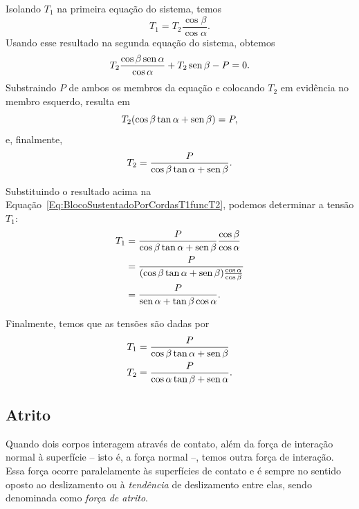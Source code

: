 \noindent{}Isolando $T_1$ na primeira equação do sistema, temos
\begin{equation}\label{Eq:BlocoSustentadoPorCordasT1funcT2}
    T_1 = T_2 \frac{\cos\beta}{\cos\alpha}.
\end{equation}
%
Usando esse resultado na segunda equação do sistema, obtemos
\begin{equation}
    T_2 \frac{\cos\beta\operatorname{sen}\alpha}{\cos\alpha} + T_2\operatorname{sen}\beta - P = 0.
\end{equation}
%
Substraindo $P$ de ambos os membros da equação e colocando $T_2$ em evidência no membro esquerdo, resulta em
\begin{equation}
    T_2 (\cos\beta\tan\alpha + \operatorname{sen}\beta) = P,
\end{equation}
%
e, finalmente,
\begin{equation}
    T_2 = \frac{P}{\cos\beta\tan\alpha + \operatorname{sen}\beta}.
\end{equation}

Substituindo o resultado acima na Equação~\eqref{Eq:BlocoSustentadoPorCordasT1funcT2}, podemos determinar a tensão $T_1$:
\begin{align}
    T_1 &= \frac{P}{\cos\beta\tan\alpha + \operatorname{sen}\beta} \frac{\cos\beta}{\cos\alpha} \\
    &= \frac{P}{(\cos\beta\tan\alpha + \operatorname{sen}\beta)\frac{\cos\alpha}{\cos\beta}} \\
    &=\frac{P}{\operatorname{sen}\alpha + \tan\beta\cos\alpha}.
\end{align}

\noindent{}Finalmente, temos que as tensões são dadas por
\begin{align}
    T_1 &= \frac{P}{\cos\beta\tan\alpha + \operatorname{sen}\beta} \\
    T_2 &= \frac{P}{\cos\alpha\tan\beta + \operatorname{sen}\alpha}.
\end{align}

\subsection{Atrito}

Quando dois corpos interagem através de contato, além da força de interação normal à superfície -- isto é, a força normal --, temos outra força de interação. Essa força ocorre paralelamente às superfícies de contato e é sempre no sentido oposto ao deslizamento ou à \emph{tendência} de deslizamento entre elas, sendo denominada como \emph{força de atrito}.

